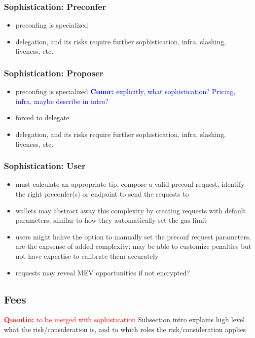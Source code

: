 \documentclass[a4paper]{article}
\theoremstyle{boldstyle}
\newcommand{\cm}[1]{\textcolor{blue}{\textbf{Conor:} #1}}
\newcommand{\qb}[1]{\textcolor{red}{\textbf{Quentin:} #1}}
\begin{document}
    \subsubsection{Sophistication: Preconfer}
        \begin{itemize}
            \item preconfing is specialized
            \item delegation, and its risks require further sophistication, infra, slashing, liveness, etc. 
        \end{itemize}
    
    \subsubsection{Sophistication: Proposer}
        \begin{itemize}
            \item preconfing is specialized \cm{explicitly, what sophistication? Pricing, infra, maybe describe in intro? }
            \item forced to delegate
            \item delegation, and its risks require further sophistication, infra, slashing, liveness, etc. 
        \end{itemize}
    
    \subsubsection{Sophistication: User}
        \begin{itemize}
            \item must calculate an appropriate tip, compose a valid preconf request, identify the right preconfer(s) or endpoint to send the requests to 
            \item wallets may abstract away this complexity by creating requests with default parameters, similar to how they automatically set the gas limit 
            \item users might hahve the option to manually set the preconf request parameters, are the expsense of added complexity: may be able to customize penalties but not have expertise to calibrate them accurately
            \item requests may reveal MEV opportunities if not encrypted? 
        \end{itemize}
    
\subsection{Fees} \qb{to be merged with sophistication}
    Subsection intro explains high level what the risk/consideration is, and to which roles the risk/consideration applies
\end{document}
